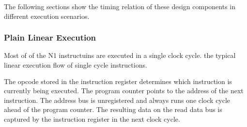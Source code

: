 The following sections show the timing relation of these design components in different execution scenarios.


\subsubsection{Plain Linear Execution}
\label{architecture:excyc:linear}

Most of of the  N1 instructuins are executed in a single clock cycle.
 the typical linear execution flow of single cycle instructions.

The opcode stored in the instruction register determines which instruction is currently being executed.
The program counter points to the address of the next instruction.
The address bus is unregistered and always runs one clock cycle ahead of the program counter. 
The resulting data on the read data bus is captured by the instruction register in the next clock cycle.

